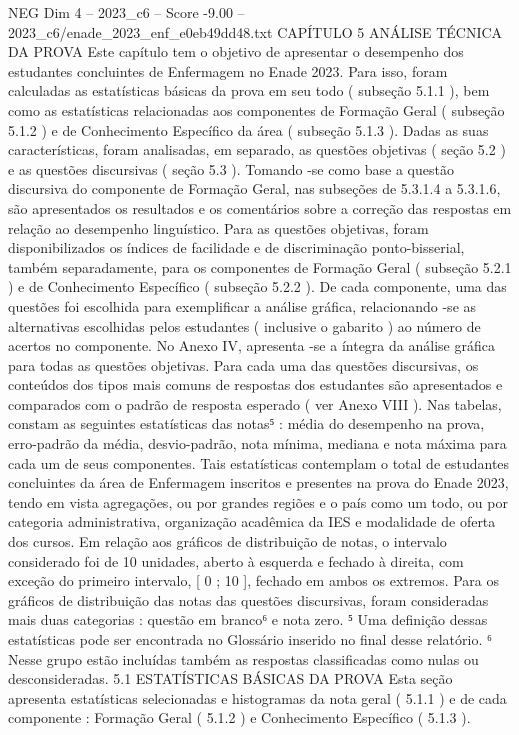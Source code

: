 \begin{textsample}{NEG Dim 4 – 2023\_c6 – Score -9.00 – 2023\_c6/enade\_2023\_enf\_e0eb49dd48.txt}  \label{ex:f4_neg_007}
CAPÍTULO 5 ANÁLISE TÉCNICA DA PROVA Este capítulo tem o objetivo de apresentar o desempenho dos estudantes concluintes de Enfermagem no Enade 2023.
Para isso, foram calculadas as estatísticas básicas da prova em seu todo ( subseção 5.1.1 ), bem como as estatísticas relacionadas aos componentes de Formação Geral ( subseção 5.1.2 ) e de Conhecimento Específico da área ( subseção 5.1.3 ).
Dadas as suas características, foram analisadas, em separado, as questões objetivas ( seção 5.2 ) e as questões discursivas ( seção 5.3 ).
Tomando -se como base a questão discursiva do componente de Formação Geral, nas subseções de 5.3.1.4 a 5.3.1.6, são apresentados os resultados e os comentários sobre a correção das respostas em relação ao desempenho linguístico.
Para as questões objetivas, foram disponibilizados os índices de facilidade e de discriminação ponto-bisserial, também separadamente, para os componentes de Formação Geral ( subseção 5.2.1 ) e de Conhecimento Específico ( subseção 5.2.2 ).
De cada componente, uma das questões foi escolhida para exemplificar a análise gráfica, relacionando -se as alternativas escolhidas pelos estudantes ( inclusive o gabarito ) ao número de acertos no componente.
No Anexo IV, apresenta -se a íntegra da análise gráfica para todas as questões objetivas.
Para cada uma das questões discursivas, os conteúdos dos tipos mais comuns de respostas dos estudantes são apresentados e comparados com o padrão de resposta esperado ( ver Anexo VIII ).
Nas tabelas, constam as seguintes estatísticas das notas⁵ : média do desempenho na prova, erro-padrão da média, desvio-padrão, nota mínima, mediana e nota máxima para cada um de seus componentes.
Tais estatísticas contemplam o total de estudantes concluintes da área de Enfermagem inscritos e presentes na prova do Enade 2023, tendo em vista agregações, ou por grandes regiões e o país como um todo, ou por categoria administrativa, organização acadêmica da IES e modalidade de oferta dos cursos.
Em relação aos gráficos de distribuição de notas, o intervalo considerado foi de 10 unidades, aberto à esquerda e fechado à direita, com exceção do primeiro intervalo, [ 0 ; 10 ], fechado em ambos os extremos.
Para os gráficos de distribuição das notas das questões discursivas, foram consideradas mais duas categorias : questão em branco⁶ e nota zero. ⁵ Uma definição dessas estatísticas pode ser encontrada no Glossário inserido no final desse relatório. ⁶ Nesse grupo estão incluídas também as respostas classificadas como nulas ou desconsideradas. 5.1 ESTATÍSTICAS BÁSICAS DA PROVA Esta seção apresenta estatísticas selecionadas e histogramas da nota geral ( 5.1.1 ) e de cada componente : Formação Geral ( 5.1.2 ) e Conhecimento Específico ( 5.1.3 ).

\end{textsample}
